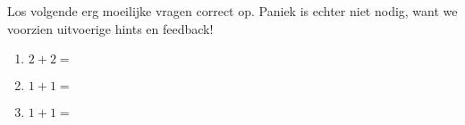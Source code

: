 \documentclass[handout]{ximera}
\begin{document}
\begin{problem}
    Los volgende erg moeilijke vragen correct op. Paniek is echter niet nodig, want we voorzien uitvoerige hints en feedback!
    \begin{enumerate}
        \item $2+2 = $
        
        \item $1+1 = $\begin{multipleChoice} \end{multipleChoice}
        
        \item $1+1 = $\begin{selectAll} \end{selectAll}
    \end{enumerate}
\end{problem}
\end{document}
